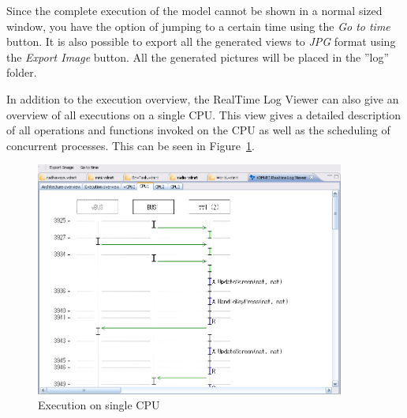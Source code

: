 Since the complete execution of the model cannot be shown in a normal
sized window, you have the option of jumping to a certain time
using the \emph{Go to time} button. It is also possible to export all
the generated views to \emph{JPG} format using the \emph{Export Image}
button. All the generated pictures will be placed in the ''log''
folder.

In addition to the execution overview, the RealTime Log Viewer can
also give an overview of all executions on a single CPU. This view
gives a detailed description of all operations and functions invoked
on the CPU as well as the scheduling of concurrent processes. This can
be seen in Figure~\ref{fig:userguide:ExecutionCPU}.

\begin{figure}[htp]
\begin{center}
  \includegraphics[width=4in]{figures/ExecutionCPU}
  \caption{Execution on single CPU}
  \label{fig:userguide:ExecutionCPU}
\end{center}
\end{figure}


%
%

